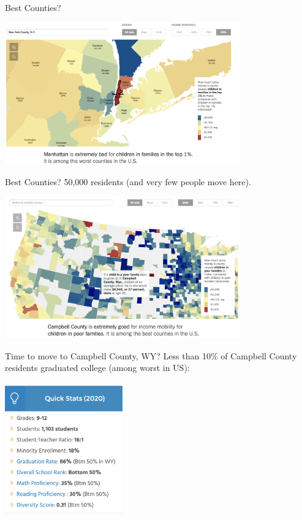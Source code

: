\documentclass[xcolor=pdftex,dvipsnames,table,mathserif,aspectratio=169]{beamer}
\begin{document}
\begin{frame}{Best Counties?}
\begin{center}
\includegraphics[width=4in]{./resources/chetty3.png}
\end{center}
\end{frame}

\begin{frame}{Best Counties?}
50,000 residents (and very few people move here).
\begin{center}
\includegraphics[width=4in]{./resources/chetty1.png}
\end{center}
\end{frame}


\begin{frame}{Time to move to Campbell County, WY?}
Less than 10\% of Campbell County residents graduated college (among worst in US):
\begin{center}
\includegraphics[width=2in]{./resources/chetty4.png}
\end{center}
\end{frame}
\end{document}
